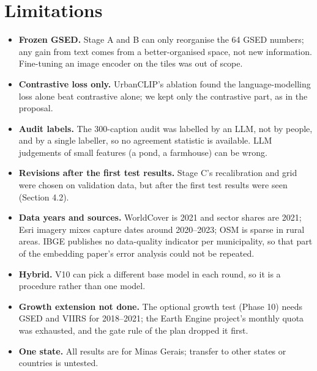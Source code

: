 \documentclass[11pt,a4paper]{article}
\begin{document}
\section{Limitations}
\begin{itemize}
\item \textbf{Frozen GSED.} Stage A and B can only reorganise the 64 GSED numbers; any gain from text comes from a
better-organised space, not new information. Fine-tuning an image encoder on the tiles was out of scope.
\item \textbf{Contrastive loss only.} UrbanCLIP's ablation found the language-modelling loss alone beat contrastive
alone; we kept only the contrastive part, as in the proposal.
\item \textbf{Audit labels.} The 300-caption audit was labelled by an LLM, not by people, and by a single labeller,
so no agreement statistic is available. LLM judgements of small features (a pond, a farmhouse) can be wrong.
\item \textbf{Revisions after the first test results.} Stage C's recalibration and grid were chosen on validation
data, but after the first test results were seen (Section 4.2).
\item \textbf{Data years and sources.} WorldCover is 2021 and sector shares are 2021; Esri imagery mixes capture dates
around 2020--2023; OSM is sparse in rural areas. IBGE publishes no data-quality indicator per municipality, so that
part of the embedding paper's error analysis could not be repeated.
\item \textbf{Hybrid.} V10 can pick a different base model in each round, so it is a procedure rather than one model.
\item \textbf{Growth extension not done.} The optional growth test (Phase 10) needs GSED and VIIRS for 2018--2021;
the Earth Engine project's monthly quota was exhausted, and the gate rule of the plan dropped it first.
\item \textbf{One state.} All results are for Minas Gerais; transfer to other states or countries is untested.
\end{itemize}

\end{document}
